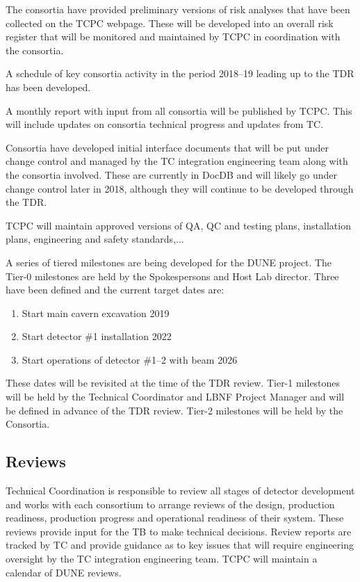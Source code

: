 The consortia have provided preliminary versions of risk analyses that
have been collected on the TCPC webpage. These will be developed into
an overall risk register that will be monitored and maintained by TCPC
in coordination with the consortia.

A schedule of key consortia activity in the period 2018--19 leading up
to the TDR has been developed.

A monthly report with input from all consortia will be published by
TCPC. This will include updates on consortia technical progress and
updates from TC.

Consortia have developed initial interface documents that will be put
under change control and managed by the TC integration engineering
team along with the consortia involved. These are currently in DocDB
and will likely go under change control later in 2018, although they
will continue to be developed through the TDR.

TCPC will maintain approved versions of QA, QC and testing plans,
installation plans, engineering and safety standards,...

A series of tiered milestones are being developed for the DUNE
project. The Tier-0 milestones are held by the Spokespersons and Host
Lab director. Three have been defined and the current target dates
are:
\begin{enumerate}
\item Start main cavern excavation \hspace{2.1in} 2019
\item Start detector \#1 installation \hspace{2.1in} 2022
\item Start operations of detector \#1--2 with beam \hspace{1in} 2026
\end{enumerate}
These dates will be revisited at the time of the TDR review.  Tier-1
milestones will be held by the Technical Coordinator and LBNF Project
Manager and will be defined in advance of the TDR review. Tier-2
milestones will be held by the Consortia.

\subsection{Reviews}
\label{sec:fdsp-coord-reviews}

Technical Coordination is responsible to review all stages of detector
development and works with each consortium to arrange reviews of the
design, production readiness, production progress and operational
readiness of their system.  These reviews provide input for the TB to
make technical decisions.  Review reports are tracked by TC and
provide guidance as to key issues that will require engineering
oversight by the TC integration engineering team. TCPC will maintain a
calendar of DUNE reviews.

